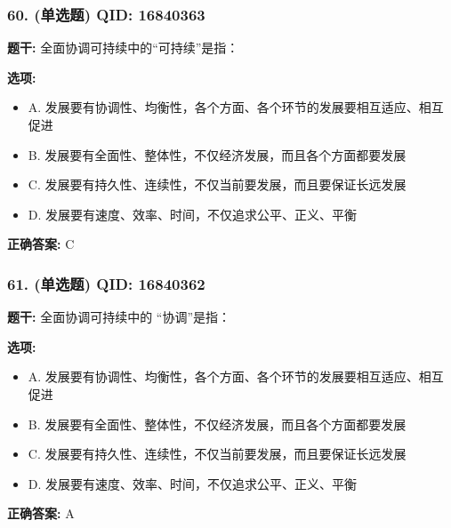 \documentclass[12pt,UTF8]{ctexart}
\begin{document}
\subsubsection*{60. (单选题) \small QID: 16840363}

\textbf{题干:}
全面协调可持续中的“可持续”是指：

\textbf{选项:}
\begin{itemize}[leftmargin=*]

  \item A. 发展要有协调性、均衡性，各个方面、各个环节的发展要相互适应、相互促进

  \item B. 发展要有全面性、整体性，不仅经济发展，而且各个方面都要发展

  \item C. 发展要有持久性、连续性，不仅当前要发展，而且要保证长远发展

  \item D. 发展要有速度、效率、时间，不仅追求公平、正义、平衡

\end{itemize}

\textbf{正确答案:}
C

\vspace{0.3em}\hrulefill\vspace{0.7em}

\subsubsection*{61. (单选题) \small QID: 16840362}

\textbf{题干:}
全面协调可持续中的 “协调”是指：

\textbf{选项:}
\begin{itemize}[leftmargin=*]

  \item A. 发展要有协调性、均衡性，各个方面、各个环节的发展要相互适应、相互促进

  \item B. 发展要有全面性、整体性，不仅经济发展，而且各个方面都要发展

  \item C. 发展要有持久性、连续性，不仅当前要发展，而且要保证长远发展

  \item D. 发展要有速度、效率、时间，不仅追求公平、正义、平衡

\end{itemize}

\textbf{正确答案:}
A
\end{document}

